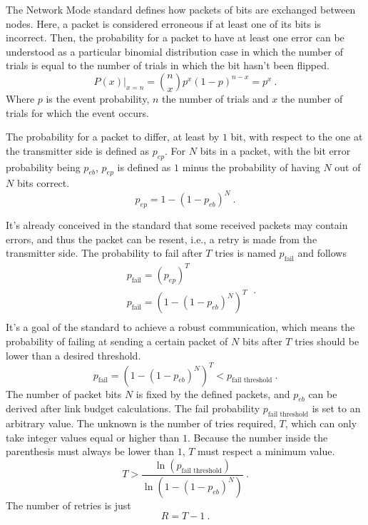 The Network Mode standard defines how packets of bits are exchanged between nodes. Here, a packet is considered erroneous if at least one of its bits is incorrect. Then, the probability for a packet to have at least one error can be understood as a particular binomial distribution case in which the number of trials is equal to the number of trials in which the bit hasn't been flipped.
\begin{equation}
	P(x)|_{x=n} = \binom{n}{x} p^x \left( 1-p \right)^{n-x} = p^x \ .
\end{equation}
Where $p$ is the event probability, $n$ the number of trials and $x$ the number of trials for which the event occurs.

The probability for a packet to differ, at least by $1$ bit, with respect to the one at the transmitter side is defined as $p_{ep}$. For $N$ bits in a packet, with the bit error probability being $p_{eb}$, $p_{ep}$ is defined as $1$ minus the probability of having $N$ out of $N$ bits correct.
\begin{equation}
	p_{ep} = 1 - \left( 1 - p_{eb} \right)^N \ .
	\label{eq:pep}
\end{equation}

It's already conceived in the standard that some received packets may contain errors, and thus the packet can be resent, i.e., a retry is made from the transmitter side. The probability to fail after $T$ tries is named $p_{\text{fail}}$ and follows
\begin{equation}
	\begin{split}
		& p_{\text{fail}} = \left( p_{ep} \right)^T \\
		& p_{\text{fail}} = \left(  1 - \left( 1 - p_{eb} \right)^N
 \right)^T \\
	\end{split} \ .
\end{equation}
It's a goal of the standard to achieve a robust communication, which means the probability of failing at sending a certain packet of $N$ bits after $T$ tries should be lower than a desired threshold.
\begin{equation}
		p_{\text{fail}} = \left(  1 - \left( 1 - p_{eb} \right)^N   \right)^T < p_{\text{fail threshold}} \ .
\end{equation}
The number of packet bits $N$ is fixed by the defined packets, and $p_{eb}$ can be derived after link budget calculations. The fail probability $p_{\text{fail threshold}}$ is set to an arbitrary value. The unknown is the number of tries required, $T$, which can only take integer values equal or higher than $1$. Because the number inside the parenthesis must always be lower than $1$, $T$ must respect a minimum value.
\begin{equation}
	T > \frac{\ln \left( p_{\text{fail threshold}}  \right) }{\ln \left( 1 - \left( 1 - p_{eb} \right)^N \right) } \ .
	\label{eq:R}
\end{equation}
The number of retries is just
\begin{equation}
	R = T - 1 \ .
\end{equation}



